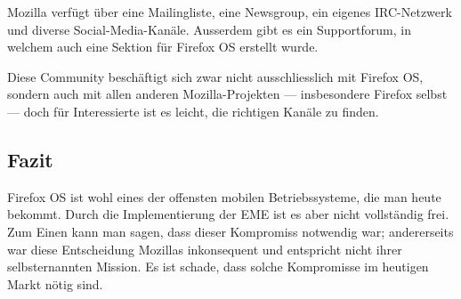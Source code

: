 Mozilla verfügt über eine Mailingliste\thinspace\cite{online:mozilla-mailinglist}, eine Newsgroup\thinspace\cite{online:mozilla-community}, ein eigenes \mbox{IRC-Netzwerk}\thinspace\cite{online:mozilla-community} und diverse \mbox{Social-Media-Kanäle}\thinspace\cite{online:mozilla-google-group}\thinspace\cite{online:mozilla-twitter}. Ausserdem gibt es ein Supportforum\thinspace\cite{online:mozilla-support}, in welchem auch eine Sektion für Firefox OS erstellt wurde. 

Diese Community beschäftigt sich zwar nicht ausschliesslich mit Firefox OS, sondern auch mit allen anderen Mozilla-Projekten --- insbesondere Firefox selbst --- doch für Interessierte ist es leicht, die richtigen Kanäle zu finden.
\newline

\subsection{Fazit}
Firefox OS ist wohl eines der offensten mobilen Betriebssysteme, die man heute bekommt. Durch die Implementierung der EME ist es aber nicht vollständig frei. Zum Einen kann man sagen, dass dieser Kompromiss notwendig war; andererseits war diese Entscheidung Mozillas inkonsequent und entspricht nicht ihrer selbsternannten Mission. Es ist schade, dass solche Kompromisse im heutigen Markt nötig sind.
